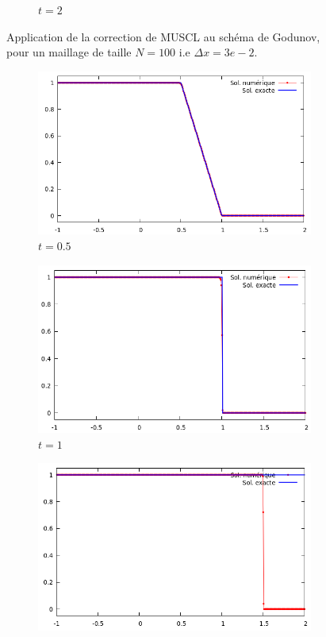 \documentclass[
	french,
	11pt, %
]{fphw}
\begin{document}
\begin{figure}[H]
\begin{subfigure}{0.32\textwidth}
		\caption{$t=2$}
		\label{fig:MusclFaux1}
	\end{subfigure}
	\caption{Application de la correction de MUSCL au schéma de Godunov, pour un maillage de taille $N=100$ i.e $\Delta x = 3e-2$.}
	\label{fig:Muscl1}
\end{figure}

\begin{figure}[H]
	\centering
	\begin{subfigure}{0.32\textwidth}
		\centering
		\includegraphics[width=\textwidth]{Muscl5.png}
		\caption{$t=0.5$}
	\end{subfigure}
	\begin{subfigure}{0.32\textwidth}
		\centering
		\includegraphics[width=\textwidth]{Muscl6.png}
		\caption{$t=1$}
	\end{subfigure}
	\begin{subfigure}{0.32\textwidth}
		\centering
		\includegraphics[width=\textwidth]{Muscl7.png}

\end{subfigure}
\end{figure}
\end{document}

